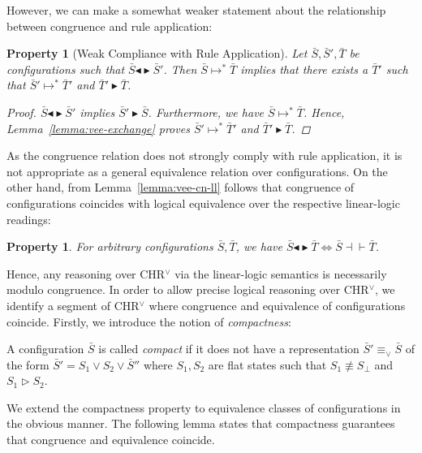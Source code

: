 \documentclass[acmtocl]{acmtrans2m}
\newtheorem{property}[theorem]{Property}
\newcommand\ent{\rhd}
\newcommand\entv{\blacktriangleright}
\renewcommand\sim{{\blacktriangleleft\blacktriangleright}}
\newcommand\equv{\equiv_\vee}
\newcommand\equivll{\dashv\vdash}
\newcommand{\bS}{\bar{S}}
\newcommand{\bT}{\bar{T}}
\begin{document}
However, we can make a somewhat weaker statement about the relationship between
congruence and rule application:

\begin{property}[Weak Compliance with Rule Application] Let $\bS,\bS',\bT$ be
configurations such that $\bS\sim\bS'$. Then $\bS\mapsto^{*}\bT$ implies that
there exists a $\bT'$ such that $\bS'\mapsto^{*}\bT'$ and $\bT'\entv\bT$.
\begin{proof}
$\bS\sim\bS'$ implies $\bS'\entv\bS$. Furthermore, we have $\bS\mapsto^{*}\bT$. Hence, Lemma~\ref{lemma:vee-exchange} proves $\bS'\mapsto^{*}\bT'$ and $\bT'\entv\bT$.
\end{proof}
\end{property}

As the congruence relation does not strongly comply with rule application, it is
not appropriate as a general equivalence relation over configurations. On the
other hand, from Lemma~\ref{lemma:vee-cn-ll} follows that congruence of
configurations coincides with logical equivalence over the respective
linear-logic readings:

\begin{property}
For arbitrary configurations $\bS,\bT$, we have $\bS\sim\bT \Leftrightarrow
\bS\equivll\bT$.
\end{property}

Hence, any reasoning over CHR$^\vee$ via the linear-logic semantics is
necessarily modulo congruence. In order to allow precise logical reasoning over
CHR$^\vee$, we identify a segment of CHR$^\vee$ where congruence and equivalence
of configurations coincide. Firstly, we introduce the notion of
\emph{compactness}:

\begin{definition}[Compactness]
 A configuration $\bS$ is called \emph{compact} if it does not have a
 representation $\bS'\equv\bS$ of the form $\bS'=S_1\vee S_2\vee\bS''$ where
 $S_1,S_2$ are flat states such that $S_1\not\equiv S_\bot$ and $S_1\ent S_2$.
\end{definition}

We extend the compactness property to equivalence classes of configurations in
the obvious manner. The following lemma states that compactness guarantees that
congruence and equivalence coincide.
\end{document}
